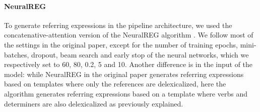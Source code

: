\documentclass[11pt,a4paper]{article}
\begin{document}
\paragraph{NeuralREG} To generate referring expressions in the pipeline architecture, we used the concatenative-attention version of the NeuralREG algorithm \cite{ferreira2018}. We follow most of the settings in the original paper, except for the number of training epochs, mini-batches, dropout, beam search and early stop of the neural networks, which we respectively set to 60, 80, 0.2, 5 and 10. Another difference is in the input of the model: while NeuralREG in the original paper generates referring expressions based on templates where only the references are delexicalized, here the algorithm generates referring expressions based on a template where verbs and determiners are also delexicalized as previously explained.
\end{document}

